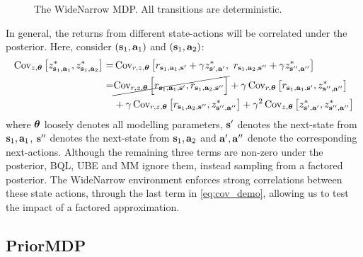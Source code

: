 \documentclass{article}
\begin{document}
\begin{appendices}
\begin{figure}[h!]
\caption[WideNarrow MDP]{The WideNarrow MDP. All transitions are deterministic.}\label{widenarrowMDP}
\end{figure}

In general, the returns from different state-actions will be correlated under the posterior. Here, consider $(\mathbf{s}_1, \mathbf{a}_1)$ and $(\mathbf{s}_1, \mathbf{a}_2)$:
\begin{align}
\operatorname{\text{Cov}}_{z, \boldsymbol{\theta}} \left[  z^*_{\mathbf{s}_1, \mathbf{a}_1}, z^*_{\mathbf{s}_1, \mathbf{a}_2} \right] = &\operatorname{\text{Cov}}_{r, z, \boldsymbol{\theta}} \left[  r_{\mathbf{s}_1, \mathbf{a}_1, \mathbf{s}'} + \gamma z^*_{\mathbf{s}', \mathbf{a}'}, ~r_{\mathbf{s}_1, \mathbf{a}_2, \mathbf{s}{''}} + \gamma z^*_{\mathbf{s}{''}, \mathbf{a}{''}} \right] \label{eq:cov_demo} \\
 =& \cancel{\operatorname{\text{Cov}}_{r, z, \boldsymbol{\theta}} \Big[ r_{\mathbf{s}_1, \mathbf{a}_1, \mathbf{s}'}, r_{\mathbf{s}_1, \mathbf{a}_2, \mathbf{s}{''}}\Big]} + \gamma \operatorname{\text{Cov}}_{r, \boldsymbol{\theta}} \left[ r_{\mathbf{s}_1, \mathbf{a}_1, \mathbf{s}'} , z^*_{\mathbf{s}{''}, \mathbf{a}{''}}  \right]\nonumber \\
&+ \gamma \operatorname{\text{Cov}}_{r, z, \boldsymbol{\theta}} \left[  r_{\mathbf{s}_1, \mathbf{a}_2, \mathbf{s}{''}} , z^*_{\mathbf{s}{''}, \mathbf{a}{''}}  \right] + \gamma^2 \operatorname{\text{Cov}}_{z, \boldsymbol{\theta}} \left[ z^*_{\mathbf{s}', \mathbf{a}'},  z^*_{\mathbf{s}{''}, \mathbf{a}{''}} \right]\nonumber
\end{align}
where $\boldsymbol{\theta}$ loosely denotes all modelling parameters, $\mathbf{s}'$ denotes the next-state from $\mathbf{s}_1, \mathbf{a}_1$, $\mathbf{s}{''}$ denotes the next-state from $\mathbf{s}_1, \mathbf{a}_2$ and $\mathbf{a}{'}, \mathbf{a}{''}$ denote the corresponding next-actions. Although the remaining three terms are non-zero under the posterior, BQL, UBE and MM ignore them, instead sampling from a factored posterior. The WideNarrow environment enforces strong correlations between these state actions, through the last term in \cref{eq:cov_demo}, allowing us to test the impact of a factored approximation.

\subsection{PriorMDP}


\end{appendices}
\end{document}
